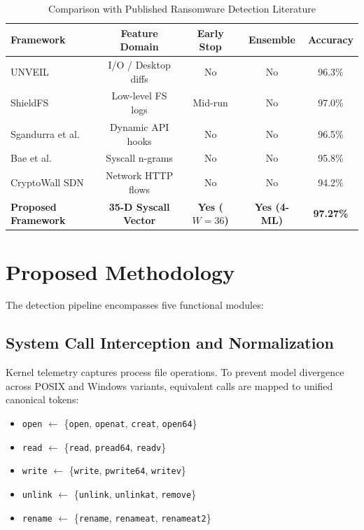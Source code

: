 \documentclass[conference]{IEEEtran}
\begin{document}
\begin{table}[htbp]
\caption{Comparison with Published Ransomware Detection Literature}
\begin{center}
\begin{tabular}{lcccc}
\toprule
\textbf{Framework} & \textbf{Feature Domain} & \textbf{Early Stop} & \textbf{Ensemble} & \textbf{Accuracy} \\
\midrule
UNVEIL~\cite{kharraz2016unveil} & I/O / Desktop diffs & No & No & 96.3\% \\
ShieldFS~\cite{continella2016shieldfs} & Low-level FS logs & Mid-run & No & 97.0\% \\
Sgandurra et al.~\cite{sgandurra2018automated} & Dynamic API hooks & No & No & 96.5\% \\
Bae et al.~\cite{bae2020ransomware} & Syscall n-grams & No & No & 95.8\% \\
CryptoWall SDN~\cite{cabaj2016software} & Network HTTP flows & No & No & 94.2\% \\
\textbf{Proposed Framework} & \textbf{35-D Syscall Vector} & \textbf{Yes ($W=36$)} & \textbf{Yes (4-ML)} & \textbf{97.27\%} \\
\bottomrule
\end{tabular}
\label{tab:related_work}
\end{center}
\end{table}

\section{Proposed Methodology}
The detection pipeline encompasses five functional modules:

\subsection{System Call Interception and Normalization}
Kernel telemetry captures process file operations. To prevent model divergence across POSIX and Windows variants, equivalent calls are mapped to unified canonical tokens:
\begin{itemize}
    \item \texttt{open} $\leftarrow$ \{\texttt{open}, \texttt{openat}, \texttt{creat}, \texttt{open64}\}
    \item \texttt{read} $\leftarrow$ \{\texttt{read}, \texttt{pread64}, \texttt{readv}\}
    \item \texttt{write} $\leftarrow$ \{\texttt{write}, \texttt{pwrite64}, \texttt{writev}\}
    \item \texttt{unlink} $\leftarrow$ \{\texttt{unlink}, \texttt{unlinkat}, \texttt{remove}\}
    \item \texttt{rename} $\leftarrow$ \{\texttt{rename}, \texttt{renameat}, \texttt{renameat2}\}
\end{itemize}
\end{document}
